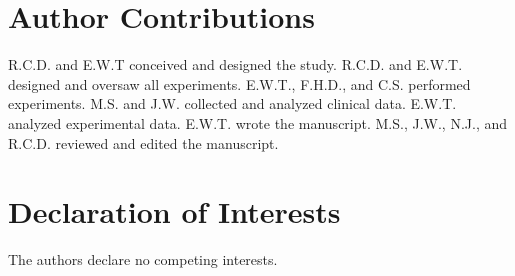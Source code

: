 \section{Author Contributions} 
R.C.D. and E.W.T conceived and designed the study. R.C.D. and E.W.T. designed and oversaw all experiments. E.W.T., F.H.D., and C.S. performed experiments. M.S. and J.W. collected and analyzed clinical data. E.W.T. analyzed experimental data. E.W.T. wrote the manuscript. M.S., J.W., N.J., and R.C.D. reviewed and edited the manuscript.

\section{Declaration of Interests}
The authors declare no competing interests.
